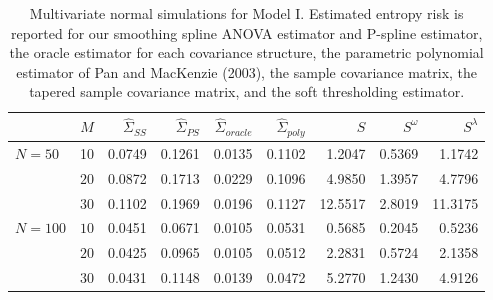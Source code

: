 \begin{table}[H]\label{simulation-1-entropy-loss-sigma-1}
\centering
\caption{Multivariate normal simulations for Model I. Estimated entropy risk is reported for our smoothing spline ANOVA estimator and P-spline estimator, the oracle estimator for each covariance structure, the parametric polynomial estimator of Pan and MacKenzie (2003), the sample covariance matrix, the tapered sample covariance matrix, and the soft thresholding estimator.} 
\begin{tabular}{lrrrrrrrr}
 & $M$ &$\hat{\Sigma}_{SS}$& $\hat{\Sigma}_{PS}$ &$\hat{\Sigma}_{oracle}$& $\hat{\Sigma}_{poly}$ & $S$ &$S^\omega$& $S^\lambda$ \\ 
  \hline
$N = 50$ & 10 & 0.0749 & 0.1261 & 0.0135 & 0.1102 & 1.2047 & 0.5369 & 1.1742 \\ 
   & $20$ & 0.0872 & 0.1713 & 0.0229 & 0.1096 & 4.9850 & 1.3957 & 4.7796 \\ 
   & $30$ & 0.1102 & 0.1969 & 0.0196 & 0.1127 & 12.5517 & 2.8019 & 11.3175 \\ 
 $N = 100$ & $10$ & 0.0451 & 0.0671 & 0.0105 & 0.0531 & 0.5685 & 0.2045 & 0.5236 \\ 
   & $20$ & 0.0425 & 0.0965 & 0.0105 & 0.0512 & 2.2831 & 0.5724 & 2.1358 \\ 
   & $30$ & 0.0431 & 0.1148 & 0.0139 & 0.0472 & 5.2770 & 1.2430 & 4.9126 \\ 
   \hline
\end{tabular}
\end{table}
